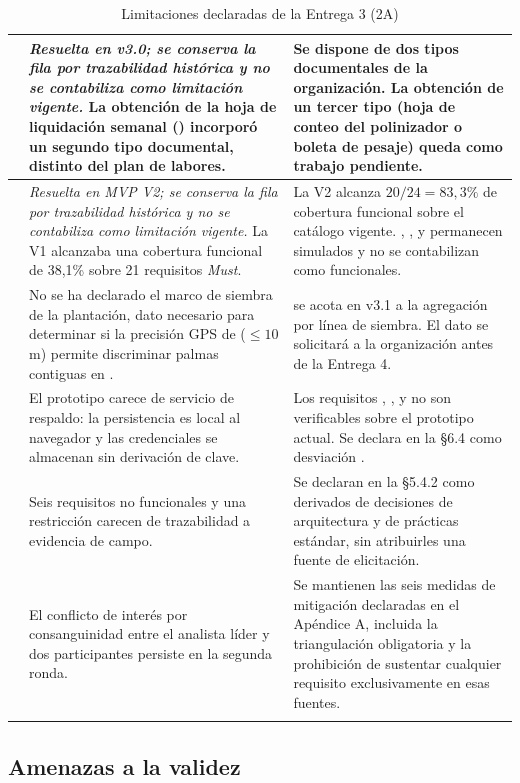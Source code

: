 \begin{longtable}{|C{1.2cm}|L{6.4cm}|L{7.4cm}|}
 & \emph{Resuelta en v3.0; se conserva la fila por trazabilidad histórica y no se contabiliza como limitación vigente.} La obtención de la hoja de liquidación semanal () incorporó un segundo tipo documental, distinto del plan de labores. & Se dispone de dos tipos documentales de la organización. La obtención de un tercer tipo (hoja de conteo del polinizador o boleta de pesaje) queda como trabajo pendiente. \\ \hline
{} & \emph{Resuelta en MVP V2; se conserva la fila por trazabilidad histórica y no se contabiliza como limitación vigente.} La V1 alcanzaba una cobertura funcional de 38{,}1\% sobre 21 requisitos \emph{Must}. & La V2 alcanza $20/24 = 83{,}3\%$ de cobertura funcional sobre el catálogo vigente. , ,  y  permanecen simulados y no se contabilizan como funcionales. \\ \hline
{} & No se ha declarado el marco de siembra de la plantación, dato necesario para determinar si la precisión GPS de  ($\leq 10$ m) permite discriminar palmas contiguas en . &  se acota en v3.1 a la agregación por línea de siembra. El dato se solicitará a la organización antes de la Entrega 4. \\ \hline
{} & El prototipo carece de servicio de respaldo: la persistencia es local al navegador y las credenciales se almacenan sin derivación de clave. & Los requisitos , ,  y  no son verificables sobre el prototipo actual. Se declara en la §6.4 como desviación . \\ \hline
{} & Seis requisitos no funcionales y una restricción carecen de trazabilidad a evidencia de campo. & Se declaran en la §5.4.2 como derivados de decisiones de arquitectura y de prácticas estándar, sin atribuirles una fuente de elicitación. \\ \hline
{} & El conflicto de interés por consanguinidad entre el analista líder y dos participantes persiste en la segunda ronda. & Se mantienen las seis medidas de mitigación declaradas en el Apéndice A, incluida la triangulación obligatoria y la prohibición de sustentar cualquier requisito exclusivamente en esas fuentes. \\ \hline
\caption{Limitaciones declaradas de la Entrega 3 (2A)}
\label{tab:limitaciones}
\end{longtable}

\subsection{Amenazas a la validez}

